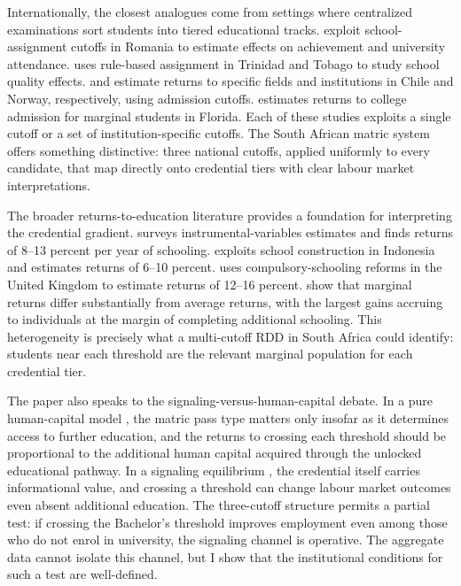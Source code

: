 \documentclass[12pt]{article}
\begin{document}
Internationally, the closest analogues come from settings where centralized examinations sort students into tiered educational tracks. \citet{popeleches2013going} exploit school-assignment cutoffs in Romania to estimate effects on achievement and university attendance. \citet{jackson2010school} uses rule-based assignment in Trinidad and Tobago to study school quality effects. \citet{hastings2013college} and \citet{kirkeboen2016field} estimate returns to specific fields and institutions in Chile and Norway, respectively, using admission cutoffs. \citet{zimmerman2014returns} estimates returns to college admission for marginal students in Florida. Each of these studies exploits a single cutoff or a set of institution-specific cutoffs. The South African matric system offers something distinctive: three national cutoffs, applied uniformly to every candidate, that map directly onto credential tiers with clear labour market interpretations.

The broader returns-to-education literature provides a foundation for interpreting the credential gradient. \citet{card1999causal} surveys instrumental-variables estimates and finds returns of 8--13 percent per year of schooling. \citet{duflo2001schooling} exploits school construction in Indonesia and estimates returns of 6--10 percent. \citet{oreopoulos2006estimating} uses compulsory-schooling reforms in the United Kingdom to estimate returns of 12--16 percent. \citet{carneiro2011estimating} show that marginal returns differ substantially from average returns, with the largest gains accruing to individuals at the margin of completing additional schooling. This heterogeneity is precisely what a multi-cutoff RDD in South Africa could identify: students near each threshold are the relevant marginal population for each credential tier.

The paper also speaks to the signaling-versus-human-capital debate. In a pure human-capital model \citep{becker1964human, mincer1974schooling}, the matric pass type matters only insofar as it determines access to further education, and the returns to crossing each threshold should be proportional to the additional human capital acquired through the unlocked educational pathway. In a signaling equilibrium \citep{spence1973job}, the credential itself carries informational value, and crossing a threshold can change labour market outcomes even absent additional education. The three-cutoff structure permits a partial test: if crossing the Bachelor's threshold improves employment even among those who do not enrol in university, the signaling channel is operative. The aggregate data cannot isolate this channel, but I show that the institutional conditions for such a test are well-defined.
\end{document}
